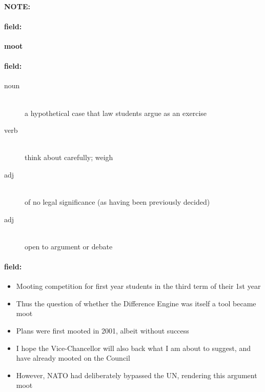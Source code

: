\documentclass[12pt]{article}
\newenvironment{note}{\paragraph{NOTE:}}{}
\newenvironment{field}{\paragraph{field:}}{}
\begin{document}
\begin{note}
\begin{field}
\textbf{\large moot}
\end{field}


\begin{field}
\begin{description}
\item[noun] \hfill \\ 
a hypothetical case that law students argue as an exercise

\item[verb] \hfill \\ 
think about carefully; weigh

\item[adj] \hfill \\ 
of no legal significance (as having been previously decided)

\item[adj] \hfill \\ 
open to argument or debate

\end{description}
\end{field}

\begin{field}
\begin{itemize}
\item Mooting competition for first year students in the third term of their 1st year
\item Thus the question of whether the Difference Engine was itself a tool became moot
\item Plans were first mooted in 2001, albeit without success
\item I hope the Vice-Chancellor will also back what I am about to suggest, and have already mooted on the Council
\item However, NATO had deliberately bypassed the UN, rendering this argument moot
\end{itemize}
\end{field}
\end{note}
\end{document}
